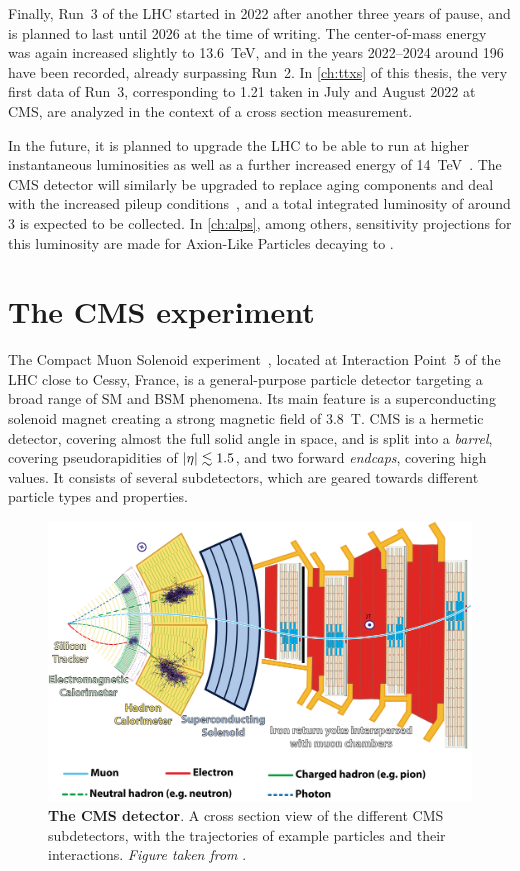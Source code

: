 Finally, Run~3 of the LHC started in 2022 after another three years of pause, and is planned to last until 2026 at the time of writing. The center-of-mass energy was again increased slightly to 13.6~TeV, and in the years 2022--2024 around \SI{196}{\fbinv} have been recorded, already surpassing Run~2. In \cref{ch:ttxs} of this thesis, the very first data of Run~3, corresponding to \SI{1.21}{\fbinv} taken in July and August 2022 at CMS, are analyzed in the context of a \ttbar cross section measurement. 

In the future, it is planned to upgrade the LHC to be able to run at higher instantaneous luminosities as well as a further increased energy of 14~TeV~\cite{ZurbanoFernandez:2020cco}. The CMS detector will similarly be upgraded to replace aging components and deal with the increased pileup conditions~\cite{CMS:TDR-15-02,CMS:PRF-21-001}, and a total integrated luminosity of around \SI{3}{\abinv} is expected to be collected. In \cref{ch:alps}, among others, sensitivity projections for this luminosity are made for Axion-Like Particles decaying to \ttbar.

\section{The CMS experiment}
\label{sec:methods:cms}

The Compact Muon Solenoid experiment~\cite{CMS:2008xjf,CMS:PRF-21-001}, located at Interaction Point~5 of the LHC close to Cessy, France, is a general-purpose particle detector targeting a broad range of SM and BSM phenomena. Its main feature is a superconducting solenoid magnet creating a strong magnetic field of 3.8~T. CMS is a hermetic detector, covering almost the full solid angle in space, and is split into a \textit{barrel}, covering pseudorapidities of $|\eta| \lesssim 1.5$, and two forward \textit{endcaps}, covering high \abseta values. It consists of several subdetectors, which are geared towards different particle types and properties.

\begin{figure}[!t]
    \centering
    \includegraphics[width=\textwidth]{figures/cms_slice.png}
    \caption{\textbf{The CMS detector}. A cross section view of the different CMS subdetectors, with the trajectories of example particles and their interactions. \textit{Figure taken from }.}
\end{figure}

